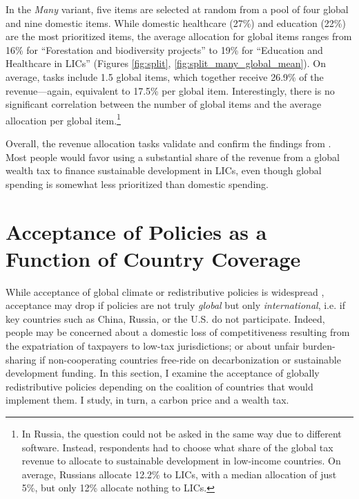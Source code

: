 \documentclass[12pt,english]{article}
\begin{document}
\begin{bibunit}
In the \textit{Many} variant, five items are selected at random from a pool of four global and nine domestic items. While domestic healthcare (27\%)
and education (22\%)
are the most prioritized items, the average allocation for global items ranges from 16\%
for ``Forestation and biodiversity projects'' to 19\%
for ``Education and Healthcare in LICs'' (Figures \ref{fig:split}, %
\ref{fig:split_many_global_mean}). On average, tasks include 1.5 global items, which together receive 26.9\% of the revenue---again, equivalent to 17.5\% per global item. Interestingly, there is no significant correlation between the number of global items and the average allocation per global item.\footnote{In Russia, the question could not be asked in the same way due to different software. Instead, respondents had to choose what share of the global tax revenue to allocate to sustainable development in low-income countries. On average, Russians allocate 12.2\% to LICs, with a median allocation of just 5\%, but only 12\% allocate nothing to LICs.} %

Overall, the revenue allocation tasks validate and confirm the findings from \cite{fabre_majority_2025}. Most people would favor using a substantial share of the revenue from a global wealth tax to finance sustainable development in LICs, even though global spending is somewhat less prioritized than domestic spending.


\section{Acceptance of %
Policies as a Function of Country Coverage\label{sec:coverage}}

While acceptance of global climate or redistributive policies is widespread \citep{fabre_majority_2025,cappelen_majority_2025}, acceptance may drop if policies are not truly \textit{global} but only \textit{international}, i.e. if key countries such as China, Russia, or the U.S. do not participate. Indeed, people may be concerned about a domestic loss of competitiveness resulting from the expatriation of taxpayers to low-tax jurisdictions; or about unfair burden-sharing if non-cooperating countries free-ride on decarbonization or sustainable development funding.
In this section, I examine the acceptance of globally redistributive policies depending on the coalition of countries that would implement them. I study, in turn, a carbon price and a wealth tax.


\end{bibunit}
\end{document}
